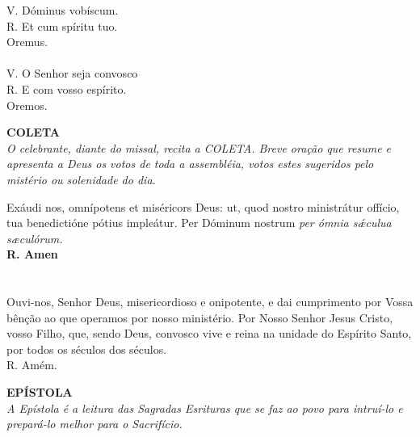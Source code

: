 \begin{multicols}{2}
	\noindent
	V. Dóminus vobíscum.
	\\R. Et cum spíritu tuo.
	\\Oremus.
	\\
	\\V. O Senhor seja convosco
	\\R. E com vosso espírito.
	\\Oremos.
\end{multicols}
\begin{center}
	\textbf{COLETA}
	\\\textit{O celebrante, diante do missal, recita a COLETA. Breve oração que resume e apresenta a Deus os votos de
	toda a assembléia, votos estes sugeridos pelo mistério ou solenidade do dia.}
\end{center}
\begin{multicols}{2}
	\noindent
	Exáudi nos, omnípotens et miséricors Deus: ut, quod nostro ministrátur offício, tua benedictióne pótius impleátur. Per Dóminum nostrum \textit{per ómnia sǽculua sæculórum.}
	\\ \textbf{R. Amen}
	\\
	\\
	\\Ouvi-nos, Senhor Deus, misericordioso e onipotente, e dai cumprimento por Vossa bênção ao que operamos por nosso ministério. Por Nosso Senhor Jesus Cristo, vosso Filho, que, sendo Deus, convosco vive e reina na unidade do Espírito Santo, por todos os séculos dos séculos. 
	\\R. Amém.
\end{multicols}
\begin{center}
	\textbf{EPÍSTOLA}
	\\\textit{A Epístola é a leitura das Sagradas Esrituras que se faz ao povo para intruí-lo e prepará-lo melhor para o Sacrifício.}
\end{center}
\newpage
